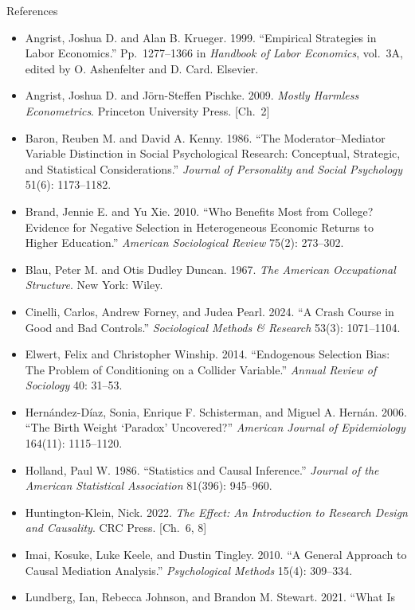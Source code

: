 \documentclass[aspectratio=169,11pt,xcolor=dvipsnames]{beamer}
\begin{document}
\begin{frame}[allowframebreaks,t]{References}
\footnotesize
\begin{itemize}\itemsep3pt
\item Angrist, Joshua D. and Alan B. Krueger. 1999. ``Empirical Strategies in
Labor Economics.'' Pp.\ 1277--1366 in \textit{Handbook of Labor Economics},
vol.\ 3A, edited by O. Ashenfelter and D. Card. Elsevier.
\item Angrist, Joshua D. and J\"orn-Steffen Pischke. 2009.
\textit{Mostly Harmless Econometrics}. Princeton University Press. [Ch.\ 2]
\item Baron, Reuben M. and David A. Kenny. 1986. ``The Moderator--Mediator
Variable Distinction in Social Psychological Research: Conceptual, Strategic,
and Statistical Considerations.'' \textit{Journal of Personality and Social
Psychology} 51(6): 1173--1182.
\item Brand, Jennie E. and Yu Xie. 2010. ``Who Benefits Most from College?
Evidence for Negative Selection in Heterogeneous Economic Returns to Higher
Education.'' \textit{American Sociological Review} 75(2): 273--302.
\item Blau, Peter M. and Otis Dudley Duncan. 1967. \textit{The American
Occupational Structure}. New York: Wiley.
\item Cinelli, Carlos, Andrew Forney, and Judea Pearl. 2024. ``A Crash Course
in Good and Bad Controls.'' \textit{Sociological Methods \& Research} 53(3):
1071--1104.
\item Elwert, Felix and Christopher Winship. 2014. ``Endogenous Selection
Bias: The Problem of Conditioning on a Collider Variable.'' \textit{Annual
Review of Sociology} 40: 31--53.
\item Hern\'andez-D\'iaz, Sonia, Enrique F. Schisterman, and Miguel A.
Hern\'an. 2006. ``The Birth Weight `Paradox' Uncovered?'' \textit{American
Journal of Epidemiology} 164(11): 1115--1120.
\item Holland, Paul W. 1986. ``Statistics and Causal Inference.''
\textit{Journal of the American Statistical Association} 81(396): 945--960.
\item Huntington-Klein, Nick. 2022. \textit{The Effect: An Introduction to
Research Design and Causality}. CRC Press. [Ch.\ 6, 8]
\item Imai, Kosuke, Luke Keele, and Dustin Tingley. 2010. ``A General Approach
to Causal Mediation Analysis.'' \textit{Psychological Methods} 15(4): 309--334.
\item Lundberg, Ian, Rebecca Johnson, and Brandon M. Stewart. 2021. ``What Is

\end{itemize}
\end{frame}
\end{document}
